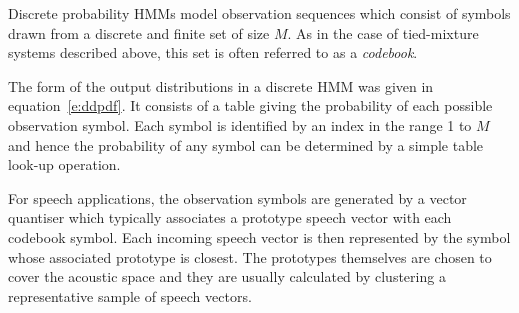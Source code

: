 

Discrete probability HMMs model 
observation sequences  which
consist of symbols drawn from a discrete and finite set of size
$M$.  As in the case of tied-mixture  systems described above,
this set is often referred to as a \textit{codebook}. 

The form of the output distributions in a discrete HMM was 
given in
equation~\ref{e:ddpdf}.  It consists of a table  giving the
probability of each possible observation symbol.  Each symbol is
identified by an index in the range 1 to $M$ and hence the
probability of any symbol can be determined by a simple
table look-up operation.

For speech
applications,  the observation symbols are generated by a 
vector quantiser which typically associates a prototype 
speech
vector with each codebook symbol.  Each incoming speech vector
is then represented by the symbol whose associated 
prototype is closest.  The prototypes themselves are chosen
to cover the acoustic space and they are usually calculated
by clustering a representative sample of speech vectors. 

